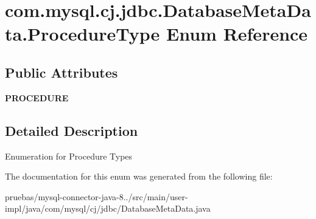 \hypertarget{enumcom_1_1mysql_1_1cj_1_1jdbc_1_1_database_meta_data_1_1_procedure_type}{}\section{com.\+mysql.\+cj.\+jdbc.\+Database\+Meta\+Data.\+Procedure\+Type Enum Reference}
\label{enumcom_1_1mysql_1_1cj_1_1jdbc_1_1_database_meta_data_1_1_procedure_type}
\subsection*{Public Attributes}
\begin{DoxyCompactItemize}
\item 
\mbox{\label{enumcom_1_1mysql_1_1cj_1_1jdbc_1_1_database_meta_data_1_1_procedure_type_a0ecc121f88388c4fab170d804c8552ce}} 
{\bfseries P\+R\+O\+C\+E\+D\+U\+RE}
\end{DoxyCompactItemize}


\subsection{Detailed Description}
Enumeration for Procedure Types 

The documentation for this enum was generated from the following file\+:\begin{DoxyCompactItemize}
\item 
pruebas/mysql-\/connector-\/java-\/8../src/main/user-\/impl/java/com/mysql/cj/jdbc/Database\+Meta\+Data.\+java\end{DoxyCompactItemize}
